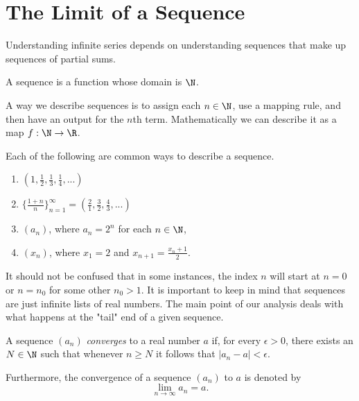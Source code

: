 
\section{The Limit of a Sequence}

Understanding infinite series depends on understanding sequences that make up sequences of partial sums.

\begin{tcolorbox}
\begin{defn}
A sequence is a function whose domain is \( \N \).
\end{defn}
\end{tcolorbox}

A way we describe sequences is to assign each \( n \in \N \), use a mapping rule, and then have an output for the \( n \)th term. Mathematically we can describe it as a map \( f: \N \to \R \).

\begin{ex}
    Each of the following are common ways to describe a sequence. 
    \begin{enumerate}
        \item \( (1, \frac{1}{2},  \frac{1}{3}, \frac{1}{4},...  )\)
        \item \( \{  \frac{1+n}{n}  \}_{n=1}^{ \infty} = ( \frac{2}{1}, \frac{3}{2}, \frac{4}{3}, ...)\)
        \item \( (a_n) \), where \( a_n = 2^n \) for each \( n \in \N \),
        \item \( (x_n)\), where \( x_1 = 2 \) and \( x_{n+1} = \frac{x_n + 1 }{2}\).
    \end{enumerate}
\end{ex}
It should not be confused that in some instances, the index \( n \) will start at \( n = 0 \) or \( n = n_0 \) for some other \( n_0 > 1 \). It is important to keep in mind that sequences are just infinite lists of real numbers. The main point of our analysis deals with what happens at the "tail" end of a given sequence. 

\begin{tcolorbox}
\begin{defn}
A sequence \( (a_n) \) \textit{converges} to a real number \( a \) if, for every \( \epsilon > 0 \), there exists an \( N \in \N \) such that whenever \( n \geq N \) it follows that \( |a_n - a | < \epsilon \).
\end{defn}
\end{tcolorbox}
Furthermore, the convergence of a sequence \( (a_n) \) to \( a \) is denoted by 
\[ \lim_{n \to \infty} a_n = a.\]

